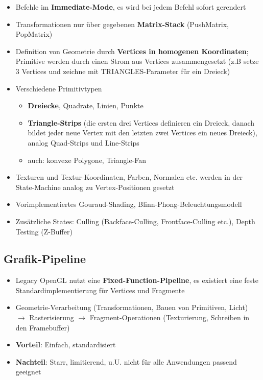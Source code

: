 \documentclass[10pt,a4paper]{article}
\begin{document}
	\begin{itemize}
		\item Befehle im \textbf{Immediate-Mode}, es wird bei jedem Befehl sofort gerendert
		\item Transformationen nur über gegebenen \textbf{Matrix-Stack} (PushMatrix, PopMatrix)
		\item Definition von Geometrie durch \textbf{Vertices in homogenen Koordinaten}; Primitive werden durch einen Strom aus Vertices zusammengesetzt (z.B setze 3 Vertices und zeichne mit TRIANGLES-Parameter für ein Dreieck)
		\item Verschiedene Primitivtypen
		\begin{itemize}
			\item \textbf{Dreiecke}, Quadrate, Linien, Punkte
			\item \textbf{Triangle-Strips} (die ersten drei Vertices definieren ein Dreieck, danach bildet jeder neue Vertex mit den letzten zwei Vertices ein neues Dreieck), analog Quad-Strips und Line-Strips
			\item auch: konvexe Polygone, Triangle-Fan
		\end{itemize}
		\item Texturen und Textur-Koordinaten, Farben, Normalen etc. werden in der State-Machine analog zu Vertex-Positionen gesetzt
		\item Vorimplementiertes Gouraud-Shading, Blinn-Phong-Beleuchtungsmodell
		\item Zusätzliche States: Culling (Backface-Culling, Frontface-Culling etc.), Depth Testing (Z-Buffer)
	\end{itemize}

	\subsection{Grafik-Pipeline}
	\label{gl:sub:grafik_pipeline}

	\begin{itemize}
		\item Legacy OpenGL nutzt eine \textbf{Fixed-Function-Pipeline}, es existiert eine feste Standardimplementierung für Vertices und Fragmente
		\item Geometrie-Verarbeitung (Transformationen, Bauen von Primitiven, Licht) $\rightarrow$ Rasterisierung $\rightarrow$ Fragment-Operationen (Texturierung, Schreiben in den Framebuffer)
		\item \textbf{Vorteil}: Einfach, standardisiert
		\item \textbf{Nachteil}: Starr, limitierend, u.U. nicht für alle Anwendungen passend geeignet
	\end{itemize}
\end{document}
